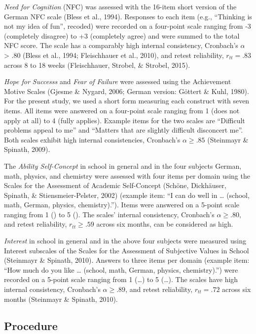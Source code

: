 \documentclass[
  man]{apa6}
\begin{document}
\emph{Need for Cognition} (NFC) was assessed with the 16-item short version of the German NFC scale (Bless et al., 1994). Responses to each item (e.g., ``Thinking is not my idea of fun'', recoded) were recorded on a four-point scale ranging from -3 (completely disagree) to +3 (completely agree) and were summed to the total NFC score. The scale has a comparably high internal consistency, Cronbach's \(\alpha\) \textgreater{} .80 (Bless et al., 1994; Fleischhauer et al., 2010), and retest reliability, \(r_{tt} = .83\) across 8 to 18 weeks (Fleischhauer, Strobel, \& Strobel, 2015).

\emph{Hope for Successs} and \emph{Fear of Failure} were assessed using the Achievement Motive Scales (Gjesme \& Nygard, 2006; German version: Göttert \& Kuhl, 1980). For the present study, we used a short form measuring each construct with seven items. All items were answered on a four-point scale ranging from 1 (does not apply at all) to 4 (fully applies). Example items for the two scales are ``Difficult problems appeal to me'' and ``Matters that are slightly difficult disconcert me''. Both scales exhibit high internal consistencies, Cronbach's \(\alpha\ge.85\) (Steinmayr \& Spinath, 2009).

The \emph{Ability Self-Concept} in school in general and in the four subjects German, math, physics, and chemistry were assessed with four items per domain using the Scales for the Assessment of Academic Self-Concept (Schöne, Dickhäuser, Spinath, \& Stiensmeier-Pelster, 2002) (example item: ``I can do well in \ldots{} (school, math, German, physics, chemistry).''). Items were answered on a 5-point scale ranging from 1 () to 5 (). The scales' internal consistency, Cronbach's \(\alpha\ge.80\), and retest reliability, \(r_{tt}\ge.59\) across six months, can be considered as high.

\emph{Interest} in school in general and in the above four subjects were measured using Interest subscales of the Scales for the Assessment of Subjective Values in School (Steinmayr \& Spinath, 2010). Answers to three items per domain (example item: ``How much do you like \ldots{} (school, math, German, physics, chemistry).'') were recorded on a 5-point scale ranging from 1 (\ldots{}) to 5 (\ldots{}). The scales have high internal consistency, Cronbach's \(\alpha\ge.89\), and retest reliability, \(r_{tt} = .72\) across six months (Steinmayr \& Spinath, 2010).

\hypertarget{procedure}{%
\subsection{Procedure}\label{procedure}}
\end{document}
